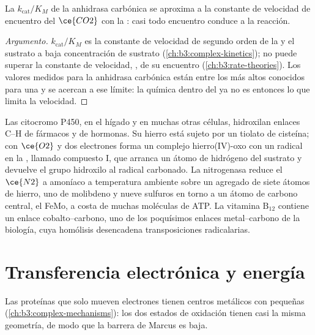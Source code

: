 \begin{proposition}\label{prop:b3:bioinorganic:carbonic-anhydrase}
La  $k_{\mathrm{cat}}/K_M$ de la anhidrasa carbónica se aproxima a la constante
de velocidad de encuentro del $\ce{CO2}$ con la : casi todo encuentro conduce a la
reacción.
\end{proposition}

\begin{proof}[Argumento]
$k_{\mathrm{cat}}/K_M$ es la constante de velocidad de segundo orden de la  y el sustrato a baja concentración
de sustrato (\cref{ch:b3:complex-kinetics}); no puede superar la
constante de velocidad, , de su encuentro
(\cref{ch:b3:rate-theories}). Los valores medidos para la anhidrasa carbónica están
entre los más altos conocidos para una  y se acercan a ese límite: la química
dentro del  ya no es entonces lo que limita la velocidad.
\end{proof}

Las  citocromo P450, en el hígado y en muchas otras células, hidroxilan enlaces C--H
de fármacos y de hormonas. Su hierro  está sujeto por un tiolato de cisteína; con
$\ce{O2}$ y dos electrones forma un complejo hierro(IV)-oxo con un radical en la
, llamado compuesto I, que arranca un átomo de hidrógeno del
sustrato y devuelve el grupo hidroxilo al radical carbonado. La nitrogenasa
reduce el $\ce{N2}$ a amoníaco a temperatura ambiente sobre un agregado de siete átomos de hierro,
uno de molibdeno y nueve sulfuros en torno a un átomo de carbono central, el 
FeMo, a costa de muchas moléculas de ATP. La vitamina $\mathrm{B_{12}}$ contiene un
enlace cobalto--carbono, uno de los poquísimos enlaces metal--carbono de la biología, cuya
homólisis desencadena transposiciones radicalarias.

\section{Transferencia electrónica y energía}

Las proteínas que solo mueven electrones tienen centros metálicos con  pequeñas (\cref{ch:b3:complex-mechanisms}): los dos estados de
oxidación tienen casi la misma geometría, de modo que la barrera de Marcus es baja.


